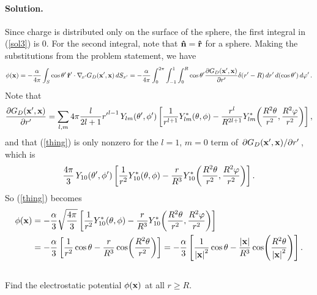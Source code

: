 \documentclass[11pt]{article}
\newcommand{\vfix}{\vspace{-\baselineskip}}
\newcommand{\refeq}[1]{(\ref{#1})}
\newcommand{\beq}{\begin{equation*}}
\newcommand{\eeq}{\end{equation*}}
\newcommand{\beqn}{\begin{equation}}
\newcommand{\eeqn}{\end{equation}}
\newenvironment{problem}
{
	\subsection{}
	\color{darkgray}
    \ignorespaces
}
{

}
\newenvironment{solution}
{
    \paragraph{Solution.}
    \ignorespaces
}
{
    \bigskip
}
\begin{document}
\begin{solution}
	Since charge is distributed only on the surface of the sphere, the first integral in \refeq{sol3} is 0.  For the second integral, note that $\mathbf{\hat{n}} = \mathbf{\hat{r}}$ for a sphere.  Making the substitutions from the problem statement, we have
	\beqn \label{thing}
		\phix = -\frac{\alp}{4\pi} \intS \costp \, \rh' \cdot \nabxp \Gdxpx \dSxp
		= -\frac{\alp}{4\pi} \intotp \intono \intoR \costp \pdv{\Gdxpx}{r'} \delta(r' - R) \drp \dctp \dvp.
	\eeqn
	Note that
	\begin{align*}
		\pdv{G_D(\mathbf{x}', \mathbf{x})}{r'} = \sum_{l,m} 4\pi \frac{l}{2l + 1} {r'}^{l-1} \, Y_{l m}(\theta', \phi') \left[ \frac{1}{r^{l + 1}} Y_{l m}^*(\theta, \phi) - \frac{r^l}{R^{2l+1}} Y_{l m}^*\!\left( \frac{R^2 \theta}{r^2}, \frac{R^2 \varphi}{r^2} \right) \right],
	\end{align*}
	and that \refeq{thing} is only nonzero for the $l = 1$, $m = 0$ term of $\pdv*{G_D(\mathbf{x}', \mathbf{x})}{r'}$, which is
	\beq
		\frac{4\pi}{3} \, Y_{1 0}\tvp \left[ \frac{1}{r^2} Y_{1 0}^*\tv - \frac{r}{R^3} Y_{1 0}^*\!\left( \frac{R^2 \tht}{r^2}, \frac{R^2 \vph}{r^2} \right) \right].
	\eeq
	So \refeq{thing} becomes
	\begin{align*}
		\phi(\mathbf{x}) &= -\frac{\alpha}{3} \sqrt{\frac{4\pi}{3}} \left[ \frac{1}{r^2} Y_{1 0}^*(\theta, \phi) - \frac{r}{R^3} Y_{1 0}^*\!\left( \frac{R^2 \theta}{r^2}, \frac{R^2 \varphi}{r^2} \right) \right] \\
		&= -\frac{\alpha}{3} \left[ \frac{1}{r^2} \cos\theta - \frac{r}{R^3} \cos(\frac{R^2 \theta}{{r}^2}) \right]
		= -\frac{\alpha}{3} \left[ \frac{1}{\abs{\mathbf{x}}^2} \cos\theta - \frac{\abs{\mathbf{x}}}{R^3} \cos(\frac{R^2 \theta}{\abs{\mathbf{x}}^2}) \right].
	\end{align*}
\end{solution}
\vfix


\begin{problem}
	Find the electrostatic potential $\phi(\mathbf{x})$ at all $r \geq R$.
\end{problem}
\end{document}
